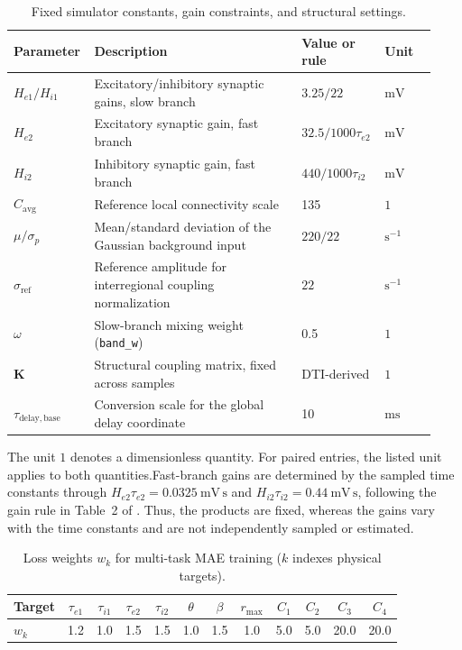 \documentclass[11pt]{article}
\begin{document}
\begin{table}[t]
\centering
\caption{Fixed simulator constants, gain constraints, and structural settings.}
\label{tab:supp_fixed}
\small
\setlength{\tabcolsep}{4pt}
\begin{tabular}{@{}p{0.16\linewidth}p{0.48\linewidth}p{0.17\linewidth}p{0.12\linewidth}@{}}
\toprule
\textbf{Parameter} & \textbf{Description} & \textbf{Value or rule} & \textbf{Unit} \\
\midrule
$H_{e1}/H_{i1}$ & Excitatory/inhibitory synaptic gains, slow branch & $3.25/22$ & $\mathrm{mV}$ \\
$H_{e2}$ & Excitatory synaptic gain, fast branch & $32.5/1000\tau_{e2}$ & $\mathrm{mV}$ \\
$H_{i2}$ & Inhibitory synaptic gain, fast branch & $440/1000\tau_{i2}$ & $\mathrm{mV}$ \\
$C_{\mathrm{avg}}$ & Reference local connectivity scale & 135 & $1$ \\
$\mu/\sigma_p$ & Mean/standard deviation of the Gaussian background input & $220/22$ & $\mathrm{s}^{-1}$ \\
$\sigma_{\mathrm{ref}}$ & Reference amplitude for interregional coupling normalization & $22$ & $\mathrm{s}^{-1}$ \\
$\omega$ & Slow-branch mixing weight (\texttt{band\_w}) & 0.5 & $1$ \\
$\mathbf{K}$ & Structural coupling matrix, fixed across samples & DTI-derived & $1$ \\
$\tau_{\mathrm{delay,base}}$ & Conversion scale for the global delay coordinate & 10 & $\mathrm{ms}$ \\
\bottomrule
\end{tabular}
\par\smallskip
\begin{minipage}{\linewidth}
\footnotesize
The unit $1$ denotes a dimensionless quantity. For paired entries, the listed unit applies to both quantities.Fast-branch gains are determined by the sampled time constants through
$H_{e2}\tau_{e2}=0.0325~\mathrm{mV\,s}$ and
$H_{i2}\tau_{i2}=0.44~\mathrm{mV\,s}$, following the gain rule in
Table~2 of \citet{coroneloliveros2026multifrequency}.
Thus, the products are fixed, whereas the gains vary with the time
constants and are not independently sampled or estimated.
\end{minipage}
\end{table}

\begin{table}[t]
\centering
\caption{Loss weights $w_k$ for multi-task MAE training ($k$ indexes physical targets).}
\label{tab:supp_weights}
\begin{tabular}{l*{11}{c}}
\toprule
Target & $\tau_{e1}$ & $\tau_{i1}$ & $\tau_{e2}$ & $\tau_{i2}$ & $\theta$ & $\beta$ & $r_{\max}$ & $C_1$ & $C_2$ & $C_3$ & $C_4$ \\
\midrule
$w_k$ & 1.2 & 1.0 & 1.5 & 1.5 & 1.0 & 1.5 & 1.0 & 5.0 & 5.0 & 20.0 & 20.0 \\
\bottomrule
\end{tabular}
\end{table}
\end{document}

